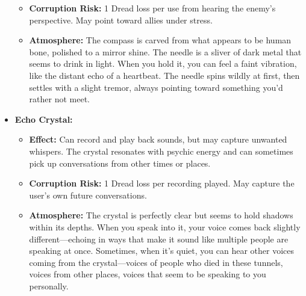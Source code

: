 \documentclass[11pt]{article}
\begin{document}
\begin{itemize}
\begin{itemize}
  \item \textbf{Corruption Risk:} 1 Dread loss per use from hearing the enemy's perspective. May point toward allies under stress.
  \item \textbf{Atmosphere:} The compass is carved from what appears to be human bone, polished to a mirror shine. The needle is a sliver of dark metal that seems to drink in light. When you hold it, you can feel a faint vibration, like the distant echo of a heartbeat. The needle spins wildly at first, then settles with a slight tremor, always pointing toward something you'd rather not meet.
  \end{itemize}
\item \textbf{Echo Crystal:} 
  \begin{itemize}
  \item \textbf{Effect:} Can record and play back sounds, but may capture unwanted whispers. The crystal resonates with psychic energy and can sometimes pick up conversations from other times or places.
  \item \textbf{Corruption Risk:} 1 Dread loss per recording played. May capture the user's own future conversations.
  \item \textbf{Atmosphere:} The crystal is perfectly clear but seems to hold shadows within its depths. When you speak into it, your voice comes back slightly different—echoing in ways that make it sound like multiple people are speaking at once. Sometimes, when it's quiet, you can hear other voices coming from the crystal—voices of people who died in these tunnels, voices from other places, voices that seem to be speaking to you personally.
  \end{itemize}
\end{itemize}
\end{document}
